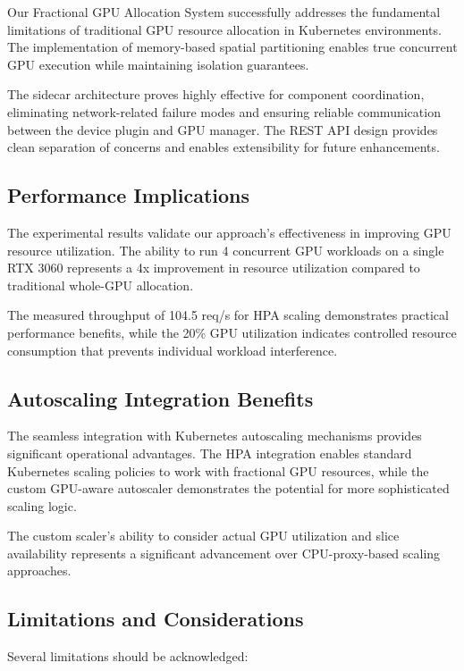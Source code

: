 \documentclass[10pt,twocolumn,letterpaper]{article}
\begin{document}
Our Fractional GPU Allocation System successfully addresses the fundamental limitations of traditional GPU resource allocation in Kubernetes environments. The implementation of memory-based spatial partitioning enables true concurrent GPU execution while maintaining isolation guarantees.

The sidecar architecture proves highly effective for component coordination, eliminating network-related failure modes and ensuring reliable communication between the device plugin and GPU manager. The REST API design provides clean separation of concerns and enables extensibility for future enhancements.

\subsection{Performance Implications}

The experimental results validate our approach's effectiveness in improving GPU resource utilization. The ability to run 4 concurrent GPU workloads on a single RTX 3060 represents a 4x improvement in resource utilization compared to traditional whole-GPU allocation.

The measured throughput of 104.5 req/s for HPA scaling demonstrates practical performance benefits, while the 20\% GPU utilization indicates controlled resource consumption that prevents individual workload interference.

\subsection{Autoscaling Integration Benefits}

The seamless integration with Kubernetes autoscaling mechanisms provides significant operational advantages. The HPA integration enables standard Kubernetes scaling policies to work with fractional GPU resources, while the custom GPU-aware autoscaler demonstrates the potential for more sophisticated scaling logic.

The custom scaler's ability to consider actual GPU utilization and slice availability represents a significant advancement over CPU-proxy-based scaling approaches.

\subsection{Limitations and Considerations}

Several limitations should be acknowledged:
\end{document}
